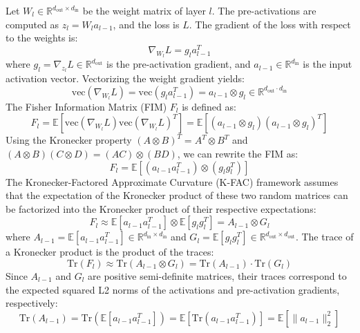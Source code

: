 \documentclass{article}
\theoremstyle{plain}
\theoremstyle{definition}
\theoremstyle{remark}
\begin{document}
Let $W_l \in \mathbb{R}^{d_{\text{out}} \times d_{\text{in}}}$ be the weight matrix of layer $l$. The pre-activations are computed as $z_l = W_l a_{l-1}$, and the loss is $L$. The gradient of the loss with respect to the weights is:
\begin{equation}
\nabla_{W_l} L = g_l a_{l-1}^T
\end{equation}
where $g_l = \nabla_{z_l} L \in \mathbb{R}^{d_{\text{out}}}$ is the pre-activation gradient, and $a_{l-1} \in \mathbb{R}^{d_{\text{in}}}$ is the input activation vector.
Vectorizing the weight gradient yields:
\begin{equation}
\text{vec}(\nabla_{W_l} L) = \text{vec}(g_l a_{l-1}^T) = a_{l-1} \otimes g_l \in \mathbb{R}^{d_{\text{out}} \cdot d_{\text{in}}}
\end{equation}
The Fisher Information Matrix (FIM) $F_l$ is defined as:
\begin{equation}
F_l = \mathbb{E} \left[ \text{vec}(\nabla_{W_l} L) \text{vec}(\nabla_{W_l} L)^T \right] = \mathbb{E} \left[ (a_{l-1} \otimes g_l) (a_{l-1} \otimes g_l)^T \right]
\end{equation}
Using the Kronecker property $(A \otimes B)^T = A^T \otimes B^T$ and $(A \otimes B)(C \otimes D) = (AC) \otimes (BD)$, we can rewrite the FIM as:
\begin{equation}
F_l = \mathbb{E} \left[ (a_{l-1} a_{l-1}^T) \otimes (g_l g_l^T) \right]
\end{equation}
The Kronecker-Factored Approximate Curvature (K-FAC) framework assumes that the expectation of the Kronecker product of these two random matrices can be factorized into the Kronecker product of their respective expectations:
\begin{equation}
F_l \approx \mathbb{E}[a_{l-1} a_{l-1}^T] \otimes \mathbb{E}[g_l g_l^T] = A_{l-1} \otimes G_l
\end{equation}
where $A_{l-1} = \mathbb{E}[a_{l-1} a_{l-1}^T] \in \mathbb{R}^{d_{\text{in}} \times d_{\text{in}}}$ and $G_l = \mathbb{E}[g_l g_l^T] \in \mathbb{R}^{d_{\text{out}} \times d_{\text{out}}}$.
The trace of a Kronecker product is the product of the traces:
\begin{equation}
\text{Tr}(F_l) \approx \text{Tr}(A_{l-1} \otimes G_l) = \text{Tr}(A_{l-1}) \cdot \text{Tr}(G_l)
\end{equation}
Since $A_{l-1}$ and $G_l$ are positive semi-definite matrices, their traces correspond to the expected squared L2 norms of the activations and pre-activation gradients, respectively:
\begin{equation}
\text{Tr}(A_{l-1}) = \text{Tr}(\mathbb{E}[a_{l-1} a_{l-1}^T]) = \mathbb{E}[\text{Tr}(a_{l-1} a_{l-1}^T)] = \mathbb{E}[\|a_{l-1}\|_2^2]
\end{equation}
\end{document}
